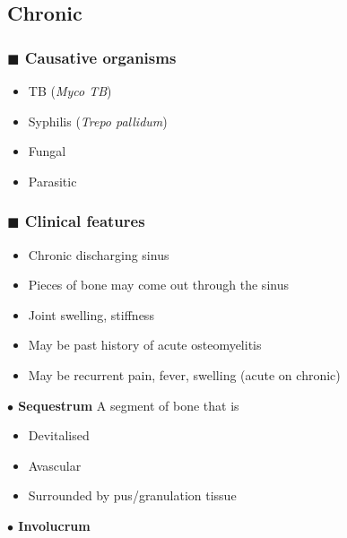 \documentclass[
  12pt,
]{memoir}
\providecommand{\tightlist}{%
  \setlength{\itemsep}{0pt}\setlength{\parskip}{0pt}}
\begin{document}
\hypertarget{chronic}{%
\subsection{Chronic}\label{chronic}}

\hypertarget{blacksquare-causative-organisms-1}{%
\subsubsection{\texorpdfstring{\(\blacksquare\) Causative
organisms}{\textbackslash blacksquare Causative organisms}}\label{blacksquare-causative-organisms-1}}

\begin{itemize}
\tightlist
\item
  TB (\emph{Myco TB})
\item
  Syphilis (\emph{Trepo pallidum})
\item
  Fungal
\item
  Parasitic
\end{itemize}

\hypertarget{blacksquare-clinical-features-1}{%
\subsubsection{\texorpdfstring{\(\blacksquare\) Clinical
features}{\textbackslash blacksquare Clinical features}}\label{blacksquare-clinical-features-1}}

\begin{itemize}
\tightlist
\item
  Chronic discharging sinus
\item
  Pieces of bone may come out through the sinus
\item
  Joint swelling, stiffness
\item
  May be past history of acute osteomyelitis
\item
  May be recurrent pain, fever, swelling (acute on chronic)
\end{itemize}

\textbf{\(\bullet\) Sequestrum} A segment of bone that is

\begin{itemize}
\tightlist
\item
  Devitalised
\item
  Avascular
\item
  Surrounded by pus/granulation tissue
\end{itemize}

\textbf{\(\bullet\) Involucrum}
\end{document}
